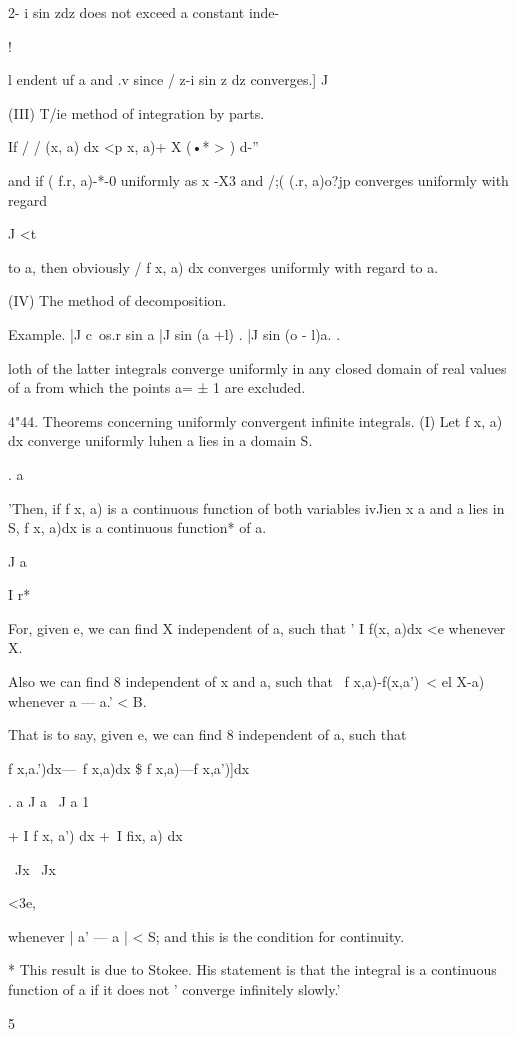 2- i sin zdz does not exceed a constant inde-

!

l endent uf a and .v since / z-i sin z dz converges.] J

(III) T/ie method of integration by parts.

If / / (x, a) dx <p x, a)+ X (•* > ) d-''

and if ( f.r, a)-*-0 uniformly as x -X3 and /;( (.r, a)o?jp converges
uniformly with regard

J <t

to a, then obviously / f x, a) dx converges uniformly with regard to
a.

(IV) The method of decomposition.

Example. |J c\ os.r sin a |J sin (a +l) . |J sin (o - l)a. .

loth of the latter integrals converge uniformly in any closed domain
of real values of a from which the points a= ± 1 are excluded.

4"44. Theorems concerning uniformly convergent infinite integrals. (I)
Let f x, a) dx converge uniformly luhen a lies in a domain S.

. a

'Then, if f x, a) is a continuous function of both variables ivJien x
a and a lies in S, f x, a)dx is a continuous function* of a.

J a

I r*

For, given e, we can find X independent of a, such that ' I f(x, a)dx
<e whenever X.

Also we can find 8 independent of x and a, such that \ f x,a)-f(x,a')\
< el X-a) whenever a — a.' < B.

That is to say, given e, we can find 8 independent of a, such that

f x,a.')dx—\ f x,a)dx \$ f x,a)—f x,a')]dx\

. a J a \ J a 1

+ I f x, a') dx +\ I fix, a) dx

\ Jx \ Jx

<3e,

whenever | a' — a | < S; and this is the condition for continuity.

* This result is due to Stokee. His statement is that the integral is
a continuous function of a if it does not ' converge infinitely
slowly.'



5



